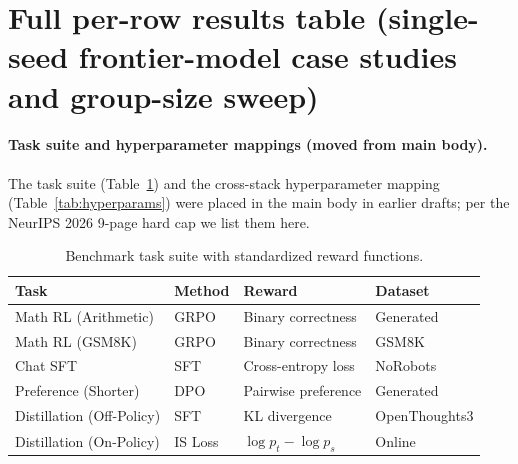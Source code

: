 \documentclass{article}
\begin{document}



\appendix


\section{Full per-row results table (single-seed frontier-model case studies and group-size sweep)}
\label{sec:appendix:full-results}

\paragraph{Task suite and hyperparameter mappings (moved from main body).}
The task suite (Table~\ref{tab:tasks}) and the cross-stack hyperparameter
mapping (Table~\ref{tab:hyperparams}) were placed in the main body in
earlier drafts; per the NeurIPS 2026 9-page hard cap we list them here.

\begin{table}[ht]
\centering
\caption{Benchmark task suite with standardized reward functions.}
\label{tab:tasks}
\begin{tabular}{llll}
\toprule
\textbf{Task} & \textbf{Method} & \textbf{Reward} & \textbf{Dataset} \\
\midrule
Math RL (Arithmetic) & GRPO & Binary correctness & Generated \\
Math RL (GSM8K) & GRPO & Binary correctness & GSM8K \\
Chat SFT & SFT & Cross-entropy loss & NoRobots \\
Preference (Shorter) & DPO & Pairwise preference & Generated \\
Distillation (Off-Policy) & SFT & KL divergence & OpenThoughts3 \\
Distillation (On-Policy) & IS Loss & $\log p_t - \log p_s$ & Online \\
\bottomrule
\end{tabular}
\end{table}
\end{document}
